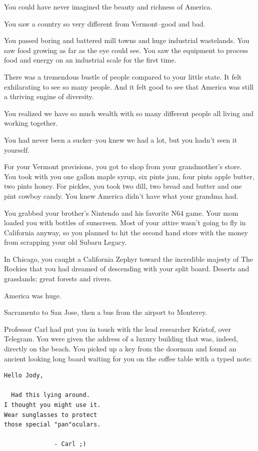 \documentclass[17pt, twoside, a5paper, openright, extrafontsizes]{memoir}
\begin{document}
You could have never imagined the beauty and richness of America.

You saw a country so very different from Vermont--good and bad.

You passed boring and battered mill towns and huge industrial
wastelands. You saw food growing as far as the eye could see. You saw
the equipment to process food and energy on an industrial scale for the
first time.

There was a tremendous bustle of people compared to your little state.
It felt exhilarating to see so many people. And it felt good to see that
America was still a thriving engine of diversity.

You realized we have so much wealth with so many different people all
living and working together.

You had never been a sucker--you knew we had a lot, but you hadn't seen
it yourself.

For your Vermont provisions, you got to shop from your grandmother's
store. You took with you one gallon maple syrup, six pints jam, four
pints apple butter, two pints honey. For pickles, you took two dill, two
bread and butter and one pint cowboy candy. You knew America didn't have
what your grandma had.

You grabbed your brother's Nintendo and his favorite N64 game. Your mom
loaded you with bottles of sunscreen. Most of your attire wasn't going
to fly in California anyway, so you planned to hit the second hand store
with the money from scrapping your old Subaru Legacy.

In Chicago, you caught a California Zephyr toward the incredible majesty
of The Rockies that you had dreamed of descending with your split board.
Deserts and grasslands; great forests and rivers.

America was huge.

Sacramento to San Jose, then a bus from the airport to Monterey.

Professor Carl had put you in touch with the lead researcher Kristof,
over Telegram. You were given the address of a luxury building that was,
indeed, directly on the beach. You picked up a key from the doorman and
found an ancient looking long board waiting for you on the coffee table
with a typed note:

\begin{verbatim}
Hello Jody, 

  Had this lying around. 
I thought you might use it.
Wear sunglasses to protect
those special "pan"oculars. 

              - Carl ;)
\end{verbatim}
\end{document}
